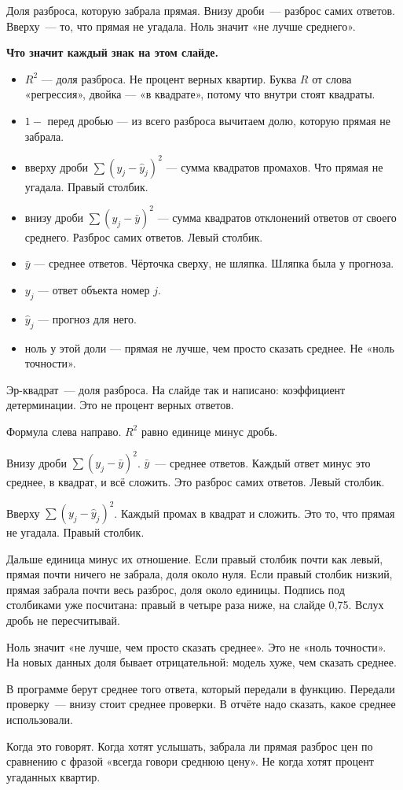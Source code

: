 \documentclass[11pt,a4paper]{article}
\newcommand{\slidehead}[2]{\par\vspace{4mm}{\color{navy}\large\bfseries Слайд #1. #2}\par\vspace{1mm}}
\newcommand{\screen}[1]{\par{\color{ink}\small #1\par}\vspace{1mm}}
\newcommand{\say}[1]{\begin{saybox}#1\end{saybox}}
\newenvironment{signs}{\begin{signbox}{\bfseries Что значит каждый знак на этом слайде.}\par\begin{itemize}[leftmargin=1.15em,itemsep=2pt,topsep=3pt,parsep=0pt]}{\end{itemize}\end{signbox}}
\begin{document}
\slidehead{22}{Доля разброса}
\screen{Доля разброса, которую забрала прямая. Внизу дроби~--- разброс самих ответов. Вверху~--- то, что прямая не угадала. Ноль значит «не лучше среднего».}
\begin{signs}
\item \(R^{2}\) — доля разброса. Не процент верных квартир. Буква \(R\) от слова «регрессия», двойка — «в квадрате», потому что внутри стоят квадраты.
\item \(1-\) перед дробью — из всего разброса вычитаем долю, которую прямая не забрала.
\item вверху дроби \(\sum(y_j-\hat y_j)^{2}\) — сумма квадратов промахов. Что прямая не угадала. Правый столбик.
\item внизу дроби \(\sum(y_j-\bar y)^{2}\) — сумма квадратов отклонений ответов от своего среднего. Разброс самих ответов. Левый столбик.
\item \(\bar y\) — среднее ответов. Чёрточка сверху, не шляпка. Шляпка была у прогноза.
\item \(y_j\) — ответ объекта номер \(j\).
\item \(\hat y_j\) — прогноз для него.
\item ноль у этой доли — прямая не лучше, чем просто сказать среднее. Не «ноль точности».
\end{signs}
\say{Эр-квадрат~--- доля разброса. На слайде так и написано: коэффициент детерминации. Это не процент верных ответов.

Формула слева направо. \(R^{2}\) равно единице минус дробь.

Внизу дроби \(\sum(y_j-\bar y)^{2}\). \(\bar y\)~--- среднее ответов. Каждый ответ минус это среднее, в квадрат, и всё сложить. Это разброс самих ответов. Левый столбик.

Вверху \(\sum(y_j-\hat y_j)^{2}\). Каждый промах в квадрат и сложить. Это то, что прямая не угадала. Правый столбик.

Дальше единица минус их отношение. Если правый столбик почти как левый, прямая почти ничего не забрала, доля около нуля. Если правый столбик низкий, прямая забрала почти весь разброс, доля около единицы. Подпись под столбиками уже посчитана: правый в четыре раза ниже, на слайде 0,75. Вслух дробь не пересчитывай.

Ноль значит «не лучше, чем просто сказать среднее». Это не «ноль точности». На новых данных доля бывает отрицательной: модель хуже, чем сказать среднее.

В программе берут среднее того ответа, который передали в функцию. Передали проверку~--- внизу стоит среднее проверки. В отчёте надо сказать, какое среднее использовали.

Когда это говорят. Когда хотят услышать, забрала ли прямая разброс цен по сравнению с фразой «всегда говори среднюю цену». Не когда хотят процент угаданных квартир.}
\end{document}

